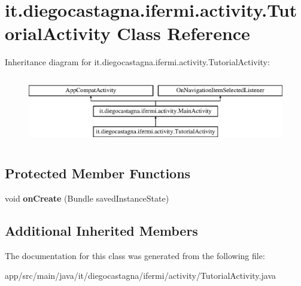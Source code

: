 \hypertarget{classit_1_1diegocastagna_1_1ifermi_1_1activity_1_1_tutorial_activity}{}\section{it.\+diegocastagna.\+ifermi.\+activity.\+Tutorial\+Activity Class Reference}
\label{classit_1_1diegocastagna_1_1ifermi_1_1activity_1_1_tutorial_activity}
Inheritance diagram for it.\+diegocastagna.\+ifermi.\+activity.\+Tutorial\+Activity\+:\begin{figure}[H]
\begin{center}
\leavevmode
\includegraphics[height=3.000000cm]{classit_1_1diegocastagna_1_1ifermi_1_1activity_1_1_tutorial_activity}
\end{center}
\end{figure}
\subsection*{Protected Member Functions}
\begin{DoxyCompactItemize}
\item 
\mbox{\label{classit_1_1diegocastagna_1_1ifermi_1_1activity_1_1_tutorial_activity_a8f9b2a2b3d9951b2cb36a9a3ce755ced}} 
void {\bfseries on\+Create} (Bundle saved\+Instance\+State)
\end{DoxyCompactItemize}
\subsection*{Additional Inherited Members}


The documentation for this class was generated from the following file\+:\begin{DoxyCompactItemize}
\item 
app/src/main/java/it/diegocastagna/ifermi/activity/Tutorial\+Activity.\+java\end{DoxyCompactItemize}
